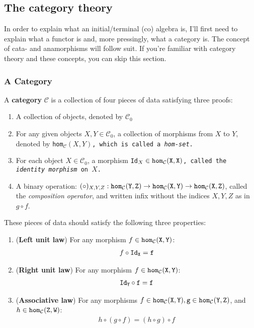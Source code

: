 \subsection{The category theory} %
In order to explain what an initial/terminal (co) algebra is, I'll first need to explain what a functor is and, more pressingly, what a category is. The concept of cata- and anamorphisms will follow suit. If you're familiar with category theory and these concepts, you can skip this section.

\subsubsection{A Category}
A \textbf{category} $\mathcal{C}$ is a collection of four pieces of data satisfying three proofs:
\newcommand{\homm}[2]{\tt{hom}_\mathcal{#1}(#2)}
\begin{enumerate}
    \item A collection of objects, denoted by $\mathcal{C}_0$
    \item For any given objects $X,Y \in \mathcal{C}_0$, a collection of morphisms from $X$ to $Y$, denoted by \tt{hom}$_\mathcal{C}(X,Y)$, which is called a \textit{hom-set}.
    \item For each object $X\in \mathcal{C}_0$, a morphism \tt{Id}$_X\in\homm{C}{X,X}$, called the \textit{identity morphism} on $X$.
    \item A binary operation: $(\circ)_{X,Y,Z}: \homm{C}{Y,Z}\to\homm{C}{X,Y}\to\homm{C}{X,Z}$, called the \textit{composition operator}, and written infix without the indices $X,Y,Z$ as in $g \circ f$.
\end{enumerate}
These pieces of data should satisfy the following three properties:
\begin{enumerate}
    \item (\textbf{Left unit law}) For any morphism $f\in\homm{C}{X,Y}$: \begin{align*} f\circ \tt{Id}_X = f \end{align*}
    \item (\textbf{Right unit law}) For any morphism $f\in\homm{C}{X,Y}$: \begin{align*} \tt{Id}_Y\circ f = f \end{align*}
    \item (\textbf{Associative law}) For any morphisms $f\in\homm{C}{X,Y},g\in\homm{C}{Y,Z}$, and $h\in\homm{C}{Z,W}$: \begin{align*} h\circ(g\circ f)=(h\circ g)\circ f \end{align*}
\end{enumerate}

